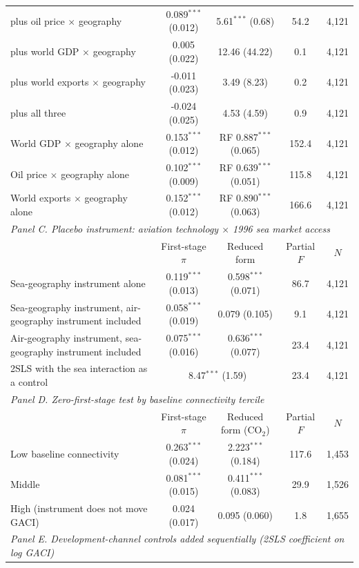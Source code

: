 \begin{table}[htbp]
\begin{threeparttable}
\begin{tabular}{lcccc}
  \quad plus oil price $\times$ geography & 0.089$^{***}$ (0.012) & 5.61$^{***}$ (0.68) & 54.2 & 4,121 \\
  \quad plus world GDP $\times$ geography & 0.005 (0.022) & 12.46 (44.22) & 0.1 & 4,121 \\
  \quad plus world exports $\times$ geography & -0.011 (0.023) & 3.49 (8.23) & 0.2 & 4,121 \\
  \quad plus all three & -0.024 (0.025) & 4.53 (4.59) & 0.9 & 4,121 \\
  World GDP $\times$ geography alone & 0.153$^{***}$ (0.012) & RF 0.887$^{***}$ (0.065) & 152.4 & 4,121 \\
  Oil price $\times$ geography alone & 0.102$^{***}$ (0.009) & RF 0.639$^{***}$ (0.051) & 115.8 & 4,121 \\
  World exports $\times$ geography alone & 0.152$^{***}$ (0.012) & RF 0.890$^{***}$ (0.063) & 166.6 & 4,121 \\
\midrule
\multicolumn{5}{l}{\textit{Panel C. Placebo instrument: aviation technology $\times$ 1996 sea market access}} \\
 & First-stage $\pi$ & Reduced form & Partial $F$ & $N$ \\
  Sea-geography instrument alone & 0.119$^{***}$ (0.013) & 0.598$^{***}$ (0.071) & 86.7 & 4,121 \\
  Sea-geography instrument, air-geography instrument included & 0.058$^{***}$ (0.019) & 0.079 (0.105) & 9.1 & 4,121 \\
  Air-geography instrument, sea-geography instrument included & 0.075$^{***}$ (0.016) & 0.636$^{***}$ (0.077) & 23.4 & 4,121 \\
  \quad 2SLS with the sea interaction as a control & \multicolumn{2}{c}{8.47$^{***}$ (1.59)} & 23.4 & 4,121 \\
\midrule
\multicolumn{5}{l}{\textit{Panel D. Zero-first-stage test by baseline connectivity tercile}} \\
 & First-stage $\pi$ & Reduced form (CO$_2$) & Partial $F$ & $N$ \\
  Low baseline connectivity & 0.263$^{***}$ (0.024) & 2.223$^{***}$ (0.184) & 117.6 & 1,453 \\
  Middle & 0.081$^{***}$ (0.015) & 0.411$^{***}$ (0.083) & 29.9 & 1,526 \\
  High (instrument does not move GACI) & 0.024 (0.017) & 0.095 (0.060) & 1.8 & 1,655 \\
\midrule
\multicolumn{5}{l}{\textit{Panel E. Development-channel controls added sequentially (2SLS coefficient on log GACI)}} \\

\end{tabular}
\end{threeparttable}
\end{table}
